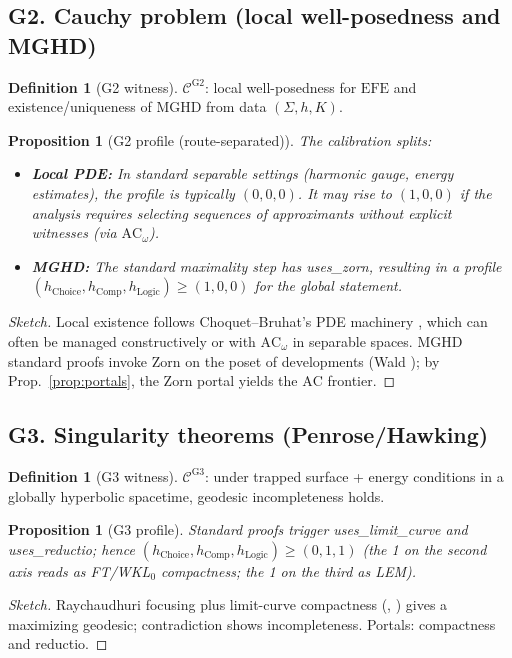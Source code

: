 \documentclass[11pt]{article}
\newtheorem{proposition}[theorem]{Proposition}
\theoremstyle{definition}
\newtheorem{definition}[theorem]{Definition}
\theoremstyle{remark}
\newcommand{\AC}{\mathrm{AC}}
\newcommand{\ACw}{\mathrm{AC}_\omega}
\newcommand{\hChoice}{h_{\mathrm{Choice}}}    %
\newcommand{\hComp}{h_{\mathrm{Comp}}}        %
\newcommand{\hLogic}{h_{\mathrm{Logic}}}      %
\newcommand{\EFE}{\mathrm{EFE}} %
\begin{document}
\subsection*{G2. Cauchy problem (local well-posedness and MGHD)}
\begin{definition}[G2 witness]
$\mathcal{C}^{\mathrm{G2}}$: local well-posedness for $\EFE$ and existence/uniqueness of MGHD from data $(\Sigma,h,K)$.
\end{definition}
\begin{proposition}[G2 profile (route-separated)]\label{prop:G2}
The calibration splits:
\begin{itemize}
    \item \textbf{Local PDE:} In standard separable settings (harmonic gauge, energy estimates), the profile is typically $(0,0,0)$. It may rise to $(1,0,0)$ if the analysis requires selecting sequences of approximants without explicit witnesses (via $\ACw$).
    \item \textbf{MGHD:} The standard maximality step has \textsf{uses\_zorn}, resulting in a profile $(\hChoice,\hComp,\hLogic)\ge(1,0,0)$ for the global statement.
\end{itemize}
\end{proposition}
\begin{proof}[Sketch]
Local existence follows Choquet--Bruhat's PDE machinery \cite{ChoquetBruhat2009}, which can often be managed constructively or with $\ACw$ in separable spaces. MGHD standard proofs invoke Zorn on the poset of developments (Wald \cite[Thm.~10.1.2]{Wald1984}); by Prop.~\ref{prop:portals}, the Zorn portal yields the $\AC$ frontier.
\end{proof}

\subsection*{G3. Singularity theorems (Penrose/Hawking)}
\begin{definition}[G3 witness]
$\mathcal{C}^{\mathrm{G3}}$: under trapped surface + energy conditions in a globally hyperbolic spacetime, geodesic incompleteness holds.
\end{definition}
\begin{proposition}[G3 profile]\label{prop:G3}
Standard proofs trigger \textsf{uses\_limit\_curve} and \textsf{uses\_reductio}; hence $(\hChoice,\hComp,\hLogic)\ge(0,1,1)$ (the 1 on the second axis reads as FT/WKL\(_0\) compactness; the 1 on the third as LEM).
\end{proposition}
\begin{proof}[Sketch]
Raychaudhuri focusing plus limit-curve compactness (\cite[§8]{HawkingEllis1973}, \cite[§14]{Wald1984}) gives a maximizing geodesic; contradiction shows incompleteness. Portals: compactness and reductio.
\end{proof}
\end{document}
